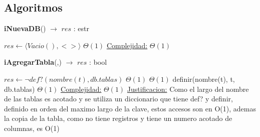 \pagebreak


\subsection{Algoritmos}

  
\begin{algorithm}[H]{\textbf{iNuevaDB}() $\to$ $res$ : estr}
    	\begin{algorithmic}[1]
			 \State $res \gets \langle Vacio(), <> \rangle$ \Comment $\Theta(1)$
			\medskip
			\Statex \underline{Complejidad:} $\Theta(1)$
    	\end{algorithmic}
\end{algorithm}


\begin{algorithm}[H]{\textbf{iAgregarTabla}(,) $\to$ $res$ : bool}
    	\begin{algorithmic}[1]
    		\State $res \gets \lnot def?(nombre(t), db.tablas) $  	\Comment $\Theta(1)$
			 							\Comment $\Theta(1)$
	   			\State definir(nombre(t), t, db.tablas)           			\Comment $\Theta(1)$
	   		\EndIf
			\medskip
			\Statex \underline{Complejidad:} $\Theta(1)$
			\Statex \underline{Justificacion:} Como el largo del nombre de las tablas es acotado y se utiliza un diccionario que tiene def? y definir, definido en orden del maximo largo de la clave, estos accesos son en O(1), ademas la copia de la tabla, como no tiene registros y tiene un numero acotado de columnas, es O(1)
    	\end{algorithmic}
\end{algorithm}



